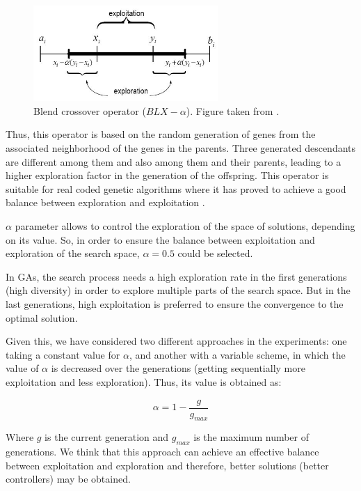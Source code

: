 \documentclass[10pt,journal,compsoc]{IEEEtran}
\begin{document}
 \begin{figure}[!ht]	
 	\begin{center}
 		\includegraphics[width=7cm]{fig/blxalpha.jpg}
 		\caption{Blend crossover operator ($BLX-\alpha$). Figure taken from \cite{Adibo_BLXFig_03}.}
 		\label{fig:blxalpha}	
 	\end{center}	
 \end{figure}

Thus, this operator is based on the random generation of genes from the associated neighborhood of the genes in the parents. Three generated descendants are different among them and also among them and their parents, leading to a higher exploration factor in the generation of the offspring.
This operator is suitable for real coded genetic algorithms where it has proved to achieve a good balance between exploration and exploitation \cite{blx2008}.

$\alpha$ parameter allows to control the exploration of the space of solutions, depending on its value. So, in order to ensure the balance between exploitation and exploration of the search space, $\alpha = 0.5$ could be selected.

In GAs, the search process needs a high exploration rate in the first generations (high diversity) in order to explore multiple parts of the search space. But in the last generations, high exploitation is preferred to ensure the convergence to the optimal solution.

Given this, we have considered two different approaches in the experiments: one taking a constant value for $\alpha$, and another with a variable scheme, in which the value of $\alpha$ is decreased over the generations (getting sequentially more exploitation and less exploration). Thus, its value is obtained as:

 \begin{equation}
 	\label{eqalpha}
 	\alpha =1-\frac{g}{g_{max}}
 \end{equation}

Where $g$ is the current generation and $g_{max}$ is the maximum number of generations. We think that this approach can achieve an effective balance between exploitation and exploration and therefore, better solutions (better controllers) may be obtained.
\end{document}
